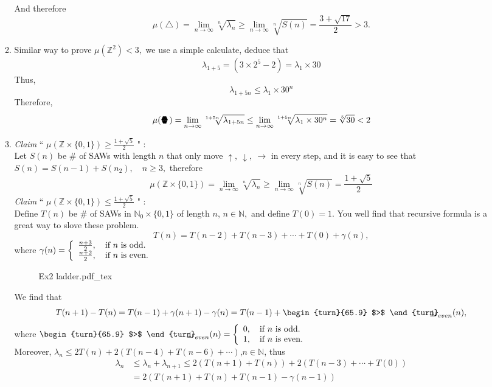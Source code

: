 \documentclass[12pt,a4paper]{article}
\newcommand{\sixedge}{\mbox{\parbox[t][-2pt][c]{10pt}{\scriptsize$\blacktriangledown\hspace{-3.6pt}\blacktriangle\hspace{-4pt}\blacktriangledown$}\hspace{-10.2pt}\parbox[b][10.7pt][c]{10pt}{\scriptsize$\blacktriangle\hspace{-3.6pt}\blacktriangledown\hspace{-3.6pt}\blacktriangle$}}}
\newcommand{\indecate}{\mbox{\begin{turn}{65.9}
$>$
\end{turn}\hspace{-10.5pt}\parbox[t][-5pt][c]{10pt}{$\bot$}\hspace{-4.35pt}\parbox[t][-3.4pt][c]{4pt}{$\shortmid$}}}
\newcommand{\incfig}[1]{%
{#1.pdf_tex}
}
\begin{document}
\begin{enumerate}
\begin{enumerate}
\[		\]
		And therefore
		\[
		\mu(\triangle)=\lim_{n\to\infty}\sqrt[n]{\lambda_n}\geq \lim_{n\to\infty}\sqrt[n]{S(n)}=\frac{3+\sqrt{17}}{2}>3.
		\]
		\item  Similar way to prove $\mu(\mathbb{Z}^2)<3,$ we use a simple calculate, deduce that 
		\[
		\lambda_{1+5}=(3\times 2^5-2)=\lambda_1\times 30
		\]
		Thus,
		\[
		\lambda_{1+5n}\leq \lambda_1\times 30^{n}
		\]
		Therefore,
		\[
		\mu(\sixedge)=\lim_{n\to\infty}\sqrt[1+5n]{\lambda_{1+5n}}\leq \lim_{n\to\infty}\sqrt[1+5n]{\lambda_1\times 30^n}=\sqrt[5]{30}<2
		\]
		\item \textit{Claim} `` $\mu(\mathbb{Z}\times\{0,1\})\geq \frac{1+\sqrt{5}}{2}$ " : \\
		Let $S(n)$ be \# of SAWs with length $n$ that only move $\uparrow,\ \downarrow,\ \rightarrow$ in every step, and it is easy to see that $S(n)=S(n-1)+S(n_2),\quad n\geq 3,$ therefore
		\[
		\mu(\mathbb{Z}\times\{0,1\})=\lim_{n\to\infty}\sqrt[n]{\lambda_n}\geq\lim_{n\to\infty}\sqrt[n]{S(n)}=\frac{1+\sqrt{5}}{2}
		\]
		\newpage
		\textit{Claim} `` $\mu(\mathbb{Z}\times\{0,1\})\leq\frac{1+\sqrt{5}}{2}$ " :\\
		Define $T(n)$ be \# of SAWs in $\mathbb{N}_0\times \{0,1\}$ of length $n$, $n\in \mathbb{N},$ and define $T(0)=1.$ You well find that recursive formula is a great way to slove these problem.
		\[
		T(n)=T(n-2)+T(n-3)+\cdots +T(0)+\gamma(n), 
		\]
		where $ \gamma(n)=\bigg\{\begin{array}[c]{l}
		\frac{n+3}{2},\quad \mbox{if } n \mbox{ is odd.}\\
		\frac{n+2}{2},\quad \mbox{if }n \mbox{ is even.}
		\end{array} $
		\begin{figure}[htp]
		\centering
		\def\svgwidth{10cm}
		\incfig{Ex2 ladder}
		\end{figure}
		We find that 
		\[
		T(n+1)-T(n)=T(n-1)+\gamma(n+1)-\gamma(n)=T(n-1)+\indecate_{even}(n),
		\]
		where $\indecate_{even}(n)=\bigg\{\begin{array}[c]{l}
		0,\quad \mbox{if } n \mbox{ is odd.}\\
		1,\quad \mbox{if }n \mbox{ is even.}
		\end{array}$\\[3pt]
		Moreover, $\lambda_n\leq 2T(n)+2(T(n-4)+T(n-6)+\cdots )$,\quad $n\in\mathbb{N}$, thus
		\begin{align*}
		    \lambda_n&\leq\lambda_n+\lambda_{n+1}\leq 2(T(n+1)+T(n))+2(T(n-3)+\cdots +T(0))\\
		    &=2(T(n+1)+T(n)+T(n-1)-\gamma(n-1))\\

\end{align*}
\end{enumerate}
\end{enumerate}
\end{document}
